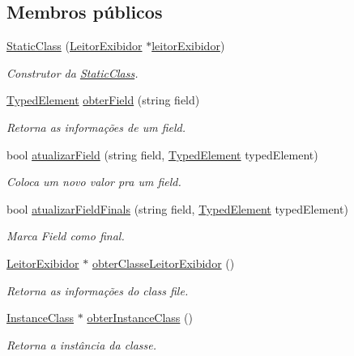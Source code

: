 \subsection*{Membros públicos}
\begin{DoxyCompactItemize}
\item 
\hyperlink{classStaticClass_a328a35510e7d0b0811a976bc989d195a}{Static\+Class} (\hyperlink{classLeitorExibidor}{Leitor\+Exibidor} $\ast$\hyperlink{classStaticClass_a3ed320a651b791f4b9bd2c4bd4b81369}{leitor\+Exibidor})
\begin{DoxyCompactList}\small\item\em Construtor da \hyperlink{classStaticClass}{Static\+Class}. \end{DoxyCompactList}\item 
\hyperlink{BasicTypes_8h_a97b332303b1262282599e6ede0637b82}{Typed\+Element} \hyperlink{classStaticClass_ac6d7d4b5b1c315623a8be477c66f38c3}{obter\+Field} (string field)
\begin{DoxyCompactList}\small\item\em Retorna as informações de um field. \end{DoxyCompactList}\item 
bool \hyperlink{classStaticClass_aa0d9a3db46155bf6971476a22c4f2eaa}{atualizar\+Field} (string field, \hyperlink{BasicTypes_8h_a97b332303b1262282599e6ede0637b82}{Typed\+Element} typed\+Element)
\begin{DoxyCompactList}\small\item\em Coloca um novo valor pra um field. \end{DoxyCompactList}\item 
bool \hyperlink{classStaticClass_a4e5d8d70d10266989b2821e10bd8dacc}{atualizar\+Field\+Finals} (string field, \hyperlink{BasicTypes_8h_a97b332303b1262282599e6ede0637b82}{Typed\+Element} typed\+Element)
\begin{DoxyCompactList}\small\item\em Marca Field como final. \end{DoxyCompactList}\item 
\hyperlink{classLeitorExibidor}{Leitor\+Exibidor} $\ast$ \hyperlink{classStaticClass_ae028bd9e2b93b69b91b22348a0b4848d}{obter\+Classe\+Leitor\+Exibidor} ()
\begin{DoxyCompactList}\small\item\em Retorna as informações do class file. \end{DoxyCompactList}\item 
\hyperlink{classInstanceClass}{Instance\+Class} $\ast$ \hyperlink{classStaticClass_a2990aa887bcb06eaec53afe467e361ef}{obter\+Instance\+Class} ()
\begin{DoxyCompactList}\small\item\em Retorna a instância da classe. \end{DoxyCompactList}\end{DoxyCompactItemize}
